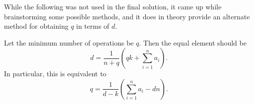 \documentclass[a4paper, 12pt]{article}
\begin{document}
\begin{solution}
    \begin{remark}
        While the following was not used in the final solution, it came up while brainstorming some possible methods, and it does in theory provide an alternate method for obtaining \( q \) in terms of \( d \).

        Let the minimum number of operations be \( q \). Then the equal element should be
        \[
            d = \frac{1}{n + q} \left( qk + \sum_{i = 1}^{n} a_i \right)
        .\]
        In particular, this is equivalent to
        \[
            q = \frac{1}{d - k} \left( \sum_{i = 1}^{n} a_i - dn \right)
        .\]
    \end{remark}
\end{solution}
\end{document}
